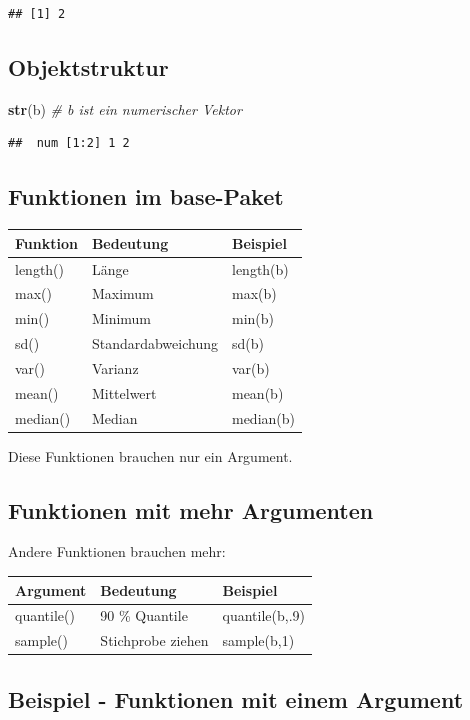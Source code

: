 \documentclass[]{article}
\newenvironment{Shaded}{\begin{snugshade}}{\end{snugshade}}
\newcommand{\KeywordTok}[1]{\textcolor[rgb]{0.13,0.29,0.53}{\textbf{{#1}}}}
\newcommand{\CommentTok}[1]{\textcolor[rgb]{0.56,0.35,0.01}{\textit{{#1}}}}
\newcommand{\NormalTok}[1]{{#1}}
\begin{document}
\begin{verbatim}
## [1] 2
\end{verbatim}

\subsection{Objektstruktur}\label{objektstruktur}

\begin{Shaded}
\begin{Highlighting}[]
\KeywordTok{str}\NormalTok{(b) }\CommentTok{# b ist ein numerischer Vektor}
\end{Highlighting}
\end{Shaded}

\begin{verbatim}
##  num [1:2] 1 2
\end{verbatim}

\subsection{Funktionen im base-Paket}\label{funktionen-im-base-paket}

\begin{longtable}[]{@{}lll@{}}
\toprule
Funktion & Bedeutung & Beispiel\tabularnewline
\midrule
\endhead
length() & Länge & length(b)\tabularnewline
max() & Maximum & max(b)\tabularnewline
min() & Minimum & min(b)\tabularnewline
sd() & Standardabweichung & sd(b)\tabularnewline
var() & Varianz & var(b)\tabularnewline
mean() & Mittelwert & mean(b)\tabularnewline
median() & Median & median(b)\tabularnewline
\bottomrule
\end{longtable}

Diese Funktionen brauchen nur ein Argument.

\subsection{Funktionen mit mehr
Argumenten}\label{funktionen-mit-mehr-argumenten}

Andere Funktionen brauchen mehr:

\begin{longtable}[]{@{}lll@{}}
\toprule
Argument & Bedeutung & Beispiel\tabularnewline
\midrule
\endhead
quantile() & 90 \% Quantile & quantile(b,.9)\tabularnewline
sample() & Stichprobe ziehen & sample(b,1)\tabularnewline
\bottomrule
\end{longtable}

\subsection{Beispiel - Funktionen mit einem
Argument}\label{beispiel---funktionen-mit-einem-argument}
\end{document}
